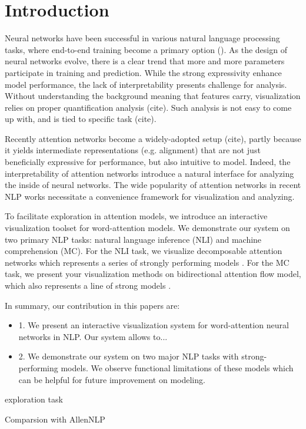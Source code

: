 \section{Introduction}

Neural networks have been successful in various natural language processing tasks,
where end-to-end training become a primary option (\cite{}).
As the design of neural networks evolve, there is a clear trend that more and more
parameters participate in training and prediction. While the strong expressivity
enhance model performance, the lack of interpretability presents challenge for analysis.
Without understanding the background meaning that features carry, visualization relies
on proper quantification analysis (cite). Such analysis is not easy to come up with,
and is tied to specific task (cite).


Recently attention networks become a widely-adopted setup (cite), partly because it yields
intermediate representations (e.g. alignment) that are not just beneficially expressive for performance,
but also intuitive to model. Indeed, the interpretability of attention networks introduce
a natural interface for analyzing the inside of neural networks. The wide popularity of attention networks
in recent NLP works necessitate a convenience framework for visualization and analyzing.

To facilitate exploration in attention models, we introduce an interactive visualization toolset
for word-attention models. We demonstrate our system on two primary NLP tasks: natural language
inference (NLI) and machine comprehension (MC). For the NLI task, we visualize
decomposable attention networks which represents a series of strongly performing models \cite{}.
For the MC task, we present your visualization methods on bidirectional attention flow model,
which also represents a line of strong models \cite{}.

In summary, our contribution in this papers are:
\begin{itemize}
	\item 1. We present an interactive visualization system for word-attention neural
	networks in NLP. Our system allows to...
	\item 2. We demonstrate our system on two major NLP tasks with strong-performing
	models. We observe functional limitations of these models which can be helpful
	for future improvement on modeling.
\end{itemize}


exploration task

Comparsion with AllenNLP
